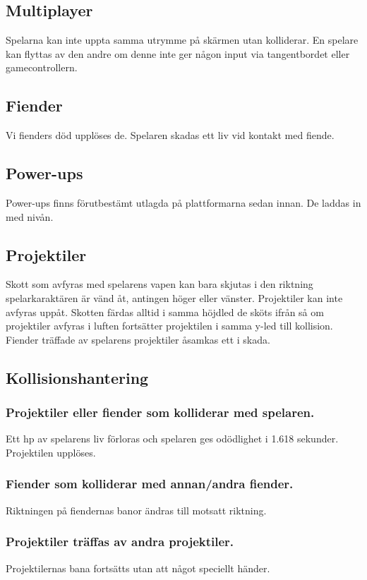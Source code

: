 \documentclass{TDP005mall}
\begin{document}
\subsection{Multiplayer}
Spelarna kan inte uppta samma utrymme på skärmen utan kolliderar. En spelare kan flyttas av den andre om denne inte ger någon input via tangentbordet eller gamecontrollern.

\subsection{Fiender}
Vi fienders död upplöses de. Spelaren skadas ett liv vid kontakt med fiende.

\subsection{Power-ups}
Power-ups finns förutbestämt utlagda på plattformarna sedan innan. De laddas in med nivån.

\subsection{Projektiler}
Skott som avfyras med spelarens vapen kan bara skjutas i den riktning spelarkaraktären är vänd åt, antingen höger eller vänster. Projektiler kan inte avfyras uppåt. Skotten färdas alltid i samma höjdled de sköts ifrån så om projektiler avfyras i luften fortsätter projektilen i samma y-led till kollision. Fiender träffade av spelarens projektiler åsamkas ett i skada.

\subsection{Kollisionshantering}
\subsubsection*{Projektiler eller fiender som kolliderar med spelaren.}
Ett hp av spelarens liv förloras och spelaren ges odödlighet i 1.618 sekunder. Projektilen upplöses.

\subsubsection*{Fiender som kolliderar med annan/andra fiender.}
Riktningen på fiendernas banor ändras till motsatt riktning.

\subsubsection*{Projektiler träffas av andra projektiler.}
Projektilernas bana fortsätts utan att något speciellt händer.
\end{document}
